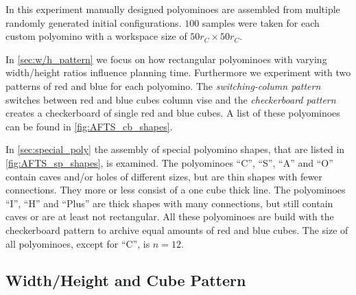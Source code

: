 
In this experiment manually designed polyominoes are assembled from multiple randomly generated initial configurations.
$100$ samples were taken for each custom polyomino with a workspace size of $50 r_C \times 50 r_C$.

In \autoref{sec:w/h_pattern} we focus on how rectangular polyominoes with varying width/height ratios influence planning time.
Furthermore we experiment with two patterns of red and blue for each polyomino.
The \textit{switching-column pattern} switches between red and blue cubes column vise and the \textit{checkerboard pattern} creates a checkerboard of single red and blue cubes.
A list of these polyominoes can be found in \autoref{fig:AFTS_cb_shapes}.

In \autoref{sec:special_poly} the assembly of special polyomino shapes, that are listed in \autoref{fig:AFTS_sp_shapes}, is examined. 
The polyominoes ``C'', ``S'', ``A'' and ``O'' contain caves and/or holes of different sizes, but are thin shapes with fewer connections.
They more or less consist of a one cube thick line.
The polyominoes ``I'', ``H'' and ``Plus'' are thick shapes with many connections, but still contain caves or are at least not rectangular.
All these polyominoes are build with the checkerboard pattern to archive equal amounts of red and blue cubes.
The size of all polyominoes, except for ``C'', is $n=12$.
 

\subsection{Width/Height and Cube Pattern}
\label{sec:w/h_pattern}

